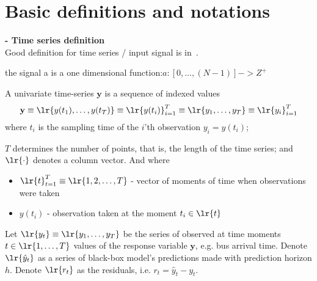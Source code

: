 \chapter{Basic definitions and notations}
%
%
%
\noindent
\textbf{- Time series definition}\\

Good definition for time series / input signal is in~\cite{gilbert2001surfing}.

the signal a is a one dimensional function:$a: [0,\dots,(N-1)] -> Z^+$

\begin{definition}
    A univariate time-series $\mathbf{y}$ is a sequence of indexed values
    \[
    \mathbf{y} 
    \equiv \lr{y (t_1), \ldots, y (t_T)} 
    \equiv \lr{y (t_i)}_{i=1}^T 
    \equiv \lr{y_1, \ldots, y_T} 
    \equiv \lr{y_i}_{i=1}^T
    \]
    where $t_i$ is the sampling time of the $i$'th observation $y_i = y (t_i)$; 
\end{definition}
$T$ determines the number of points, that is, the length of the time series; 
and $\lr{\cdot}$ denotes a column vector. 
And where
\begin{itemize}
\item $\lr{t}_{t=1}^T \equiv \lr{1, 2, \dots, T}$ - vector of moments of time when observations were taken
\item $y(t_i)$ - observation taken at the moment $t_i \in \lr{t}$
\end{itemize}

Let $ \lr{y_t} \equiv \lr{y_1,\dots, y_T}$ be the series of observed at time moments $t \in \lr{1,\dots, T}$ values of the response variable $\mathbf{y}$, e.g. bus arrival time.
Denote $\lr{\hat{y}_t}$ as a series of black-box model's predictions made with prediction horizon $h$.
Denote $\lr{r_t}$ as the residuals, i.e. $r_t = \hat{y}_t - y_t$.

